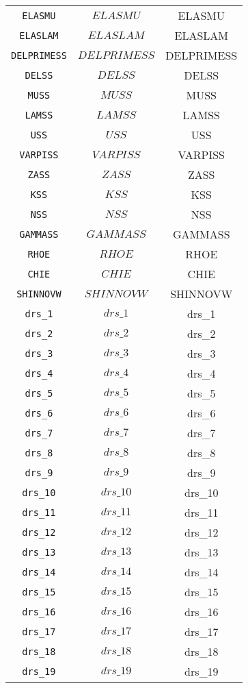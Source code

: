 \begin{center}
\begin{longtable}{ccc}
\texttt{ELASMU} & $ELASMU$ & ELASMU\\
\texttt{ELASLAM} & $ELASLAM$ & ELASLAM\\
\texttt{DELPRIMESS} & $DELPRIMESS$ & DELPRIMESS\\
\texttt{DELSS} & $DELSS$ & DELSS\\
\texttt{MUSS} & $MUSS$ & MUSS\\
\texttt{LAMSS} & $LAMSS$ & LAMSS\\
\texttt{USS} & $USS$ & USS\\
\texttt{VARPISS} & $VARPISS$ & VARPISS\\
\texttt{ZASS} & $ZASS$ & ZASS\\
\texttt{KSS} & $KSS$ & KSS\\
\texttt{NSS} & $NSS$ & NSS\\
\texttt{GAMMASS} & $GAMMASS$ & GAMMASS\\
\texttt{RHOE} & $RHOE$ & RHOE\\
\texttt{CHIE} & $CHIE$ & CHIE\\
\texttt{SHINNOVW} & $SHINNOVW$ & SHINNOVW\\
\texttt{drs\_1} & $drs\_1$ & drs\_1\\
\texttt{drs\_2} & $drs\_2$ & drs\_2\\
\texttt{drs\_3} & $drs\_3$ & drs\_3\\
\texttt{drs\_4} & $drs\_4$ & drs\_4\\
\texttt{drs\_5} & $drs\_5$ & drs\_5\\
\texttt{drs\_6} & $drs\_6$ & drs\_6\\
\texttt{drs\_7} & $drs\_7$ & drs\_7\\
\texttt{drs\_8} & $drs\_8$ & drs\_8\\
\texttt{drs\_9} & $drs\_9$ & drs\_9\\
\texttt{drs\_10} & $drs\_10$ & drs\_10\\
\texttt{drs\_11} & $drs\_11$ & drs\_11\\
\texttt{drs\_12} & $drs\_12$ & drs\_12\\
\texttt{drs\_13} & $drs\_13$ & drs\_13\\
\texttt{drs\_14} & $drs\_14$ & drs\_14\\
\texttt{drs\_15} & $drs\_15$ & drs\_15\\
\texttt{drs\_16} & $drs\_16$ & drs\_16\\
\texttt{drs\_17} & $drs\_17$ & drs\_17\\
\texttt{drs\_18} & $drs\_18$ & drs\_18\\
\texttt{drs\_19} & $drs\_19$ & drs\_19\\

\end{longtable}
\end{center}
